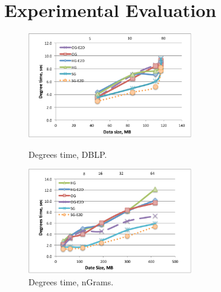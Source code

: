 \section{Experimental Evaluation}
\label{sec:exp}

\begin{figure}[t!]
\centering
\begin{minipage}{3.3in}
  \centering
  \includegraphics[width=2.8in]{figs/degrees_dblp.pdf}
  \vspace{-0.1in}
  \caption{Degrees time, DBLP.}
  \label{fig:deg_dblp}
  \vspace{-0.1in}
\end{minipage}
\begin{minipage}{3.3in}
  \centering
\includegraphics[width=2.8in]{figs/degrees_ngrams.pdf}
  \vspace{-0.1in}
\caption{Degrees time, nGrams.}
\label{fig:deg_ngrams}
  \vspace{-0.1in}
\end{minipage}
\end{figure}

